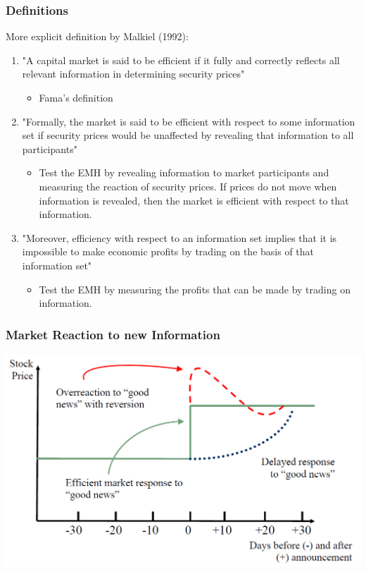 \documentclass[xcolor=dvipsnames, english, 8pt]{beamer}
\begin{document}
\begin{frame}
    \frametitle{Definitions}
More explicit definition by Malkiel (1992):\vspace{0.25cm}\\
\begin{enumerate}[1.]
    \item "A capital market is said to be efficient if it fully and correctly reflects all
relevant information in determining security prices"
\begin{itemize}
    \item Fama's definition \vspace{0.25cm}\\
\end{itemize}
\item "Formally, the market is said to be efficient with respect to some information
set if security prices would be unaffected by revealing that information to all
participants"
\begin{itemize}
    \item Test the EMH by revealing information to market participants and measuring the reaction of security prices. If
prices do not move when information is revealed, then the market is efficient with respect to that information.\vspace{0.25cm}\\
\end{itemize}
\item "Moreover, efficiency with respect to an information set implies that it is
impossible to make economic profits by trading on the basis of that
information set"
\begin{itemize}
    \item Test the EMH by measuring the profits that can be made by trading on information.
\end{itemize}

\end{enumerate}
\end{frame}


\begin{frame}
    \frametitle{Market Reaction to new Information}

\begin{center}
    \includegraphics[scale=0.4]{EMH1}
\end{center}
\end{frame}
\end{document}
